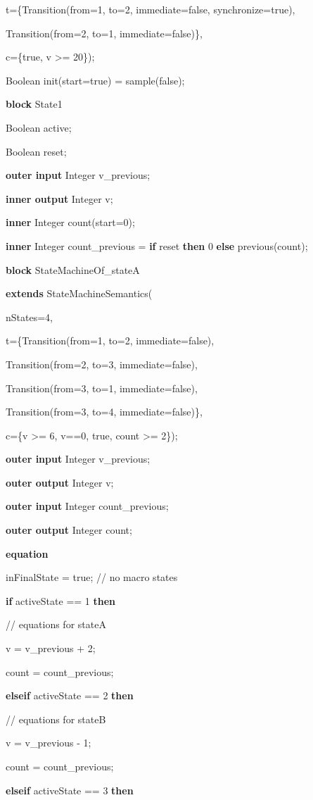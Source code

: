 \documentclass[10pt,a4paper]{report}
\begin{document}
t=\{Transition(from=1, to=2, immediate=false, synchronize=true),

Transition(from=2, to=1, immediate=false)\},

c=\{true, v \textgreater{}= 20\});

Boolean init(start=true) = sample(false);

\textbf{block} State1

Boolean active;

Boolean reset;

\textbf{outer input} Integer v\_previous;

\textbf{inner output} Integer v;

\textbf{inner} Integer count(start=0);

\textbf{inner} Integer count\_previous = \textbf{if} reset \textbf{then}
0 \textbf{else} previous(count);

\textbf{block} StateMachineOf\_stateA

\textbf{extends} StateMachineSemantics(

nStates=4,

t=\{Transition(from=1, to=2, immediate=false),

Transition(from=2, to=3, immediate=false),

Transition(from=3, to=1, immediate=false),

Transition(from=3, to=4, immediate=false)\},

c=\{v \textgreater{}= 6, v==0, true, count \textgreater{}= 2\});

\textbf{outer input} Integer v\_previous;

\textbf{outer output} Integer v;

\textbf{outer input} Integer count\_previous;

\textbf{outer output} Integer count;

\textbf{equation }

inFinalState = true; // no macro states

\textbf{if} activeState == 1 \textbf{then}

// equations for stateA

v = v\_previous + 2;

count = count\_previous;

\textbf{elseif} activeState == 2 \textbf{then}

// equations for stateB

v = v\_previous - 1;

count = count\_previous;

\textbf{elseif} activeState == 3 \textbf{then}
\end{document}
